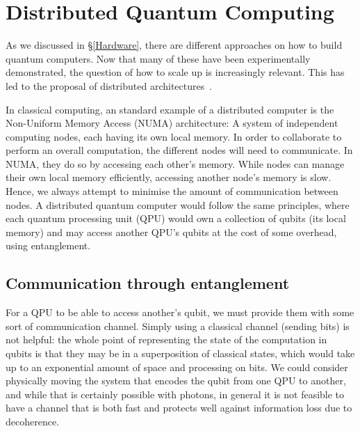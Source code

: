 \chapter{Distributed Quantum Computing}
\label{chap:Distributed}

As we discussed in \S\ref{Hardware}, there are different approaches on how to build quantum computers. Now that many of these have been experimentally demonstrated, the question of how to scale up is increasingly relevant. This has led to the proposal of distributed architectures~\citep{ArchitectureSurvey}.

In classical computing, an standard example of a distributed computer is the Non-Uniform Memory Access (NUMA) architecture: A system of independent computing nodes, each having its own local memory. In order to collaborate to perform an overall computation, the different nodes will need to communicate. In NUMA, they do so by accessing each other's memory. While nodes can manage their own local memory efficiently, accessing another node's memory is slow. Hence, we always attempt to minimise the amount of communication between nodes. A distributed quantum computer would follow the same principles, where each quantum processing unit (QPU) would own a collection of qubits (its local memory) and may access another QPU's qubits at the cost of some overhead, using entanglement.

\section{Communication through entanglement}
\label{Ebits}

For a QPU to be able to access another's qubit, we must provide them with some sort of communication channel. Simply using a classical channel (sending bits) is not helpful: the whole point of representing the state of the computation in qubits is that they may be in a superposition of classical states, which would take up to an exponential amount of space and processing on bits. We could consider physically moving the system that encodes the qubit from one QPU to another, and while that is certainly possible with photons, in general it is not feasible to have a channel that is both fast and protects well against information loss due to decoherence.

